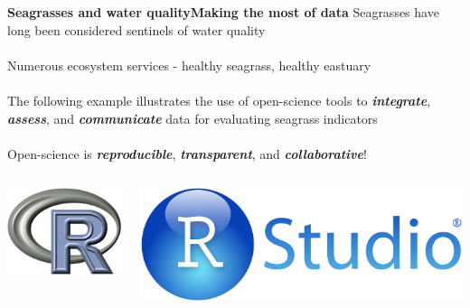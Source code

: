 \documentclass[serif]{beamer}\usepackage[]{graphicx}\usepackage[]{color}
\newcommand{\emtxt}[1]{\textbf{\textit{#1}}}
\begin{document}
\begin{frame}{\textbf{Seagrasses and water quality}}{\textbf{Making the most of data}}
\onslide<+->
Seagrasses have long been considered sentinels of water quality \\~\\
Numerous ecosystem services - healthy seagrass, healthy eastuary \\~\\
The following example illustrates the use of open-science tools to \emtxt{integrate}, \emtxt{assess}, and \emtxt{communicate} data for evaluating seagrass indicators \\~\\
\onslide<+->
Open-science is \emtxt{reproducible}, \emtxt{transparent}, and \emtxt{collaborative}!
\begin{columns}
\begin{column}{0.2\textwidth}
\centerline{\includegraphics[width = \textwidth]{fig/Rlogo.png}}
\end{column}
\begin{column}{0.2\textwidth}
\centerline{\includegraphics[width = \textwidth]{fig/RStudio.png}}
\end{column}

\end{columns}
\end{frame}
\end{document}
